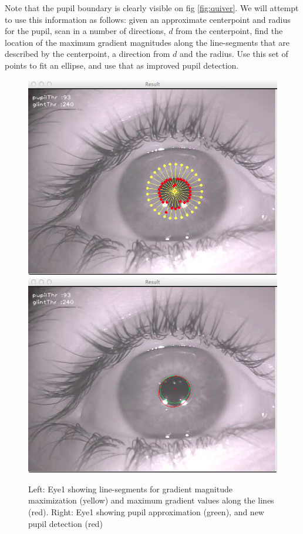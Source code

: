 \documentclass[a4paper,11pt]{article}
\begin{document}
Note that the pupil boundary is clearly visible on fig \ref{fig:quiver}. We will attempt to use this information as follows: given an approximate centerpoint and radius for the pupil, scan in a number of directions, $d$ from the centerpoint, find the location of the maximum gradient magnitudes along the line-segments that are described by the centerpoint, a direction from $d$ and the radius. Use this set of points to fit an ellipse, and use that as improved pupil detection. 

\begin{figure}[ht]
  \centering
  \includegraphics[scale=0.25]{gradient_circle}
  \includegraphics[scale=0.25]{gradient_pupil}
  \caption{Left: Eye1 showing line-segments for gradient magnitude maximization (yellow) and maximum gradient values along the lines (red). Right: Eye1 showing pupil approximation (green), and new pupil detection (red)}
  \label{fig:gradient_circle}
\end{figure}
\end{document}
